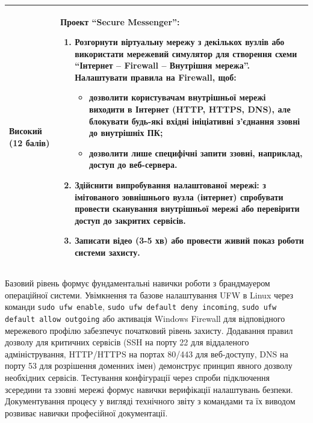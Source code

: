 \begin{longtable}{
  | >{\raggedright\arraybackslash}p{} 
  | >{\raggedright\arraybackslash}p{} |
}
\cellcolor{TableBodyGreen}
\small \textbf{Високий} (12 балів) &
\small \textbf{Проект ``Secure Messenger'':}
\begin{enumerate}
    \item Розгорнути віртуальну мережу з декількох вузлів або використати мережевий симулятор для створення схеми “Інтернет – Firewall – Внутрішня мережа”. Налаштувати правила на Firewall, щоб: \vspace{-0.5em}
    \begin{itemize}
        \item дозволити користувачам внутрішньої мережі виходити в Інтернет (HTTP, HTTPS, DNS), але блокувати будь-які вхідні ініціативні з’єднання ззовні до внутрішніх ПК; \vspace{-0.5em}
        \item дозволити лише специфічні запити ззовні, наприклад, доступ до веб-сервера.
    \end{itemize} 
    \item Здійснити випробування налаштованої мережі: з імітованого зовнішнього вузла (інтернет) спробувати провести сканування внутрішньої мережі або перевірити доступ до закритих сервісів.
    \item Записати відео (3-5 хв) або провести живий показ роботи системи захисту.
    
\end{enumerate} \\ \hline

\end{longtable}

Базовий рівень формує фундаментальні навички роботи з брандмауером операційної системи. Увімкнення та базове налаштування UFW в Linux через команди \texttt{sudo ufw enable}, \texttt{sudo ufw default deny incoming}, \texttt{sudo ufw default allow outgoing} або активація Windows Firewall для відповідного мережевого профілю забезпечує початковий рівень захисту. Додавання правил дозволу для критичних сервісів (SSH на порту 22 для віддаленого адміністрування, HTTP/HTTPS на портах 80/443 для веб-доступу, DNS на порту 53 для розрішення доменних імен) демонструє принцип явного дозволу необхідних сервісів. Тестування конфігурації через спроби підключення зсередини та ззовні мережі формує навички верифікації налаштувань безпеки. Документування процесу у вигляді технічного звіту з командами та їх виводом розвиває навички професійної документації.

